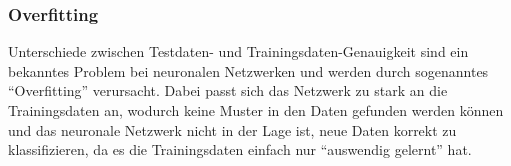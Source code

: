 \documentclass[10pt]{article}
\newcommand{\form}[1]{#1} %
\newcommand{\feng}[1]{{#1}}
\newcommand{\sig}{\textrm{sig}}
\begin{document}

	


\subsubsection{Overfitting}

Unterschiede zwischen Testdaten- und Trainingsdaten-Genauigkeit sind ein bekanntes Problem bei neuronalen Netzwerken und werden durch sogenanntes \enquote{Overfitting} verursacht.
Dabei passt sich das Netzwerk zu stark an die Trainingsdaten an, wodurch keine Muster in den Daten gefunden werden können und das neuronale Netzwerk nicht in der Lage ist, neue Daten korrekt zu klassifizieren, da es die Trainingsdaten einfach nur \enquote{auswendig gelernt} hat.  %
 
\end{document}
